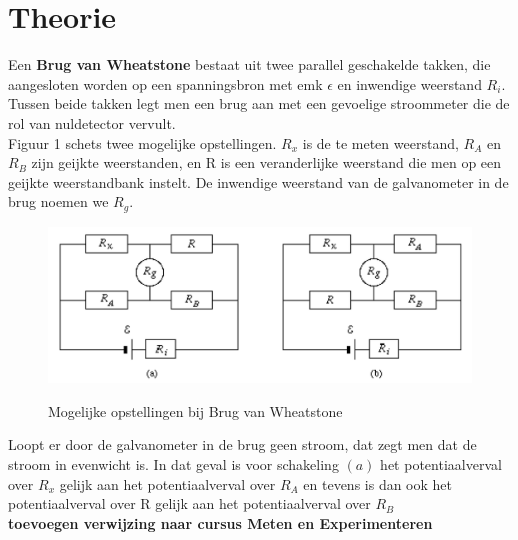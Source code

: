 \section{Theorie}

Een \textbf{Brug van Wheatstone} bestaat uit twee parallel geschakelde takken,
die aangesloten worden op een spanningsbron met emk $\epsilon$ en inwendige 
weerstand $R_{i}$. Tussen beide takken legt men een brug aan met een gevoelige
stroommeter die de rol van nuldetector vervult. 
\\

Figuur 1 schets twee mogelijke opstellingen.
$R_{x}$ is de te meten weerstand, $R_{A}$ en $R_{B}$ zijn geijkte weerstanden, en R is een 
veranderlijke weerstand die men op een geijkte weerstandbank instelt. De inwendige weerstand 
van de galvanometer in de brug noemen we $R_{g}$.
\\

\begin{figure}[H]
    \centering
    \caption{Mogelijke opstellingen bij Brug van Wheatstone}
    \includegraphics[width=\textwidth]{img/brug.png}
    \label{fig:grafiek}
\end{figure}

Loopt er door de galvanometer in de brug geen stroom, dat zegt men dat de stroom in evenwicht is.
In dat geval is voor schakeling $(a)$ het potentiaalverval over $R_{x}$ gelijk aan het potentiaalverval 
over $R_{A}$ en tevens is dan ook het potentiaalverval over R gelijk aan het potentiaalverval over $R_{B}$
\\

\textbf{toevoegen verwijzing naar cursus Meten en Experimenteren}